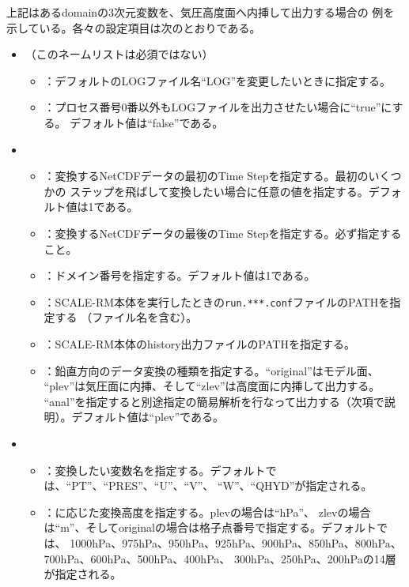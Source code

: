 \noindent 上記はあるdomainの3次元変数を、気圧高度面へ内挿して出力する場合の
例を示している。各々の設定項目は次のとおりである。
\begin{itemize}
 \item {}（このネームリストは必須ではない）
 \begin{itemize}
  \item {}：デフォルトのLOGファイル名``LOG''を変更したいときに指定する。
  \item {}：プロセス番号0番以外もLOGファイルを出力させたい場合に``true''にする。
        デフォルト値は``false''である。
 \end{itemize}
 \item {}
 \begin{itemize}
  \item {}：変換するNetCDFデータの最初のTime Stepを指定する。最初のいくつかの
        ステップを飛ばして変換したい場合に任意の値を指定する。デフォルト値は1である。
  \item {}：変換するNetCDFデータの最後のTime Stepを指定する。必ず指定すること。
  \item {}：ドメイン番号を指定する。デフォルト値は1である。
  \item {}：SCALE-RM本体を実行したときの\verb|run.***.conf|ファイルのPATHを指定する
        （ファイル名を含む）。
  \item {}：SCALE-RM本体のhistory出力ファイルのPATHを指定する。
  \item {}：鉛直方向のデータ変換の種類を指定する。``original''はモデル面、
        ``plev''は気圧面に内挿、そして``zlev''は高度面に内挿して出力する。
        ``anal''を指定すると別途指定の簡易解析を行なって出力する（次項で説明）。デフォルト値は``plev''である。
 \end{itemize}
 \item {}
 \begin{itemize}
  \item {}：変換したい変数名を指定する。デフォルトでは、``PT''、``PRES''、``U''、``V''、
        ``W''、``QHYD''が指定される。
  \item {}：に応じた変換高度を指定する。plevの場合は``hPa''、
        zlevの場合は``m''、そしてoriginalの場合は格子点番号で指定する。デフォルトでは、
        1000hPa、975hPa、950hPa、925hPa、900hPa、850hPa、800hPa、700hPa、600hPa、500hPa、400hPa、
        300hPa、250hPa、200hPaの14層が指定される。
 \end{itemize}
\end{itemize}

